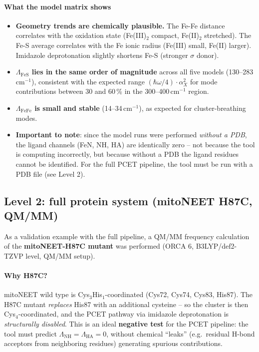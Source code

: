 \documentclass[11pt,a4paper,twoside]{article}
\theoremstyle{remark}
\begin{document}
\paragraph{What the model matrix shows}
\begin{itemize}\setlength{\itemsep}{0pt}
  \item \textbf{Geometry trends are chemically plausible.}
        The Fe-Fe distance correlates with the oxidation state
        (Fe(III)$_2$ compact, Fe(II)$_2$ stretched). The Fe-S
        average correlates with the Fe ionic radius (Fe(III)
        small, Fe(II) larger). Imidazole deprotonation slightly
        shortens Fe-S (stronger $\sigma$ donor).
  \item \textbf{$\Lambda_\text{FeS}$ lies in the same order of
        magnitude} across all five models (130--283\,cm$^{-1}$),
        consistent with the expected range
        $(\hbar\omega/4)\cdot\alpha_X^2$ for mode contributions
        between 30 and 60\,\% in the 300--400\,cm$^{-1}$ region.
  \item \textbf{$\Lambda_\text{FeFe}$ is small and stable}
        (14--34\,cm$^{-1}$), as expected for cluster-breathing
        modes.
  \item \textbf{Important to note}: since the model runs were
        performed \emph{without a PDB}, the ligand channels (FeN,
        NH, HA) are identically zero -- not because the tool is
        computing incorrectly, but because without a PDB the
        ligand residues cannot be identified. For the full PCET
        pipeline, the tool must be run with a PDB file (see
        Level 2).
\end{itemize}

\subsection{Level 2: full protein system (mitoNEET H87C, QM/MM)}
\label{sec:val-mitoneet-h87c}

As a validation example with the full pipeline, a QM/MM frequency
calculation of the \textbf{mitoNEET-H87C mutant} was performed
(ORCA 6, B3LYP/def2-TZVP level, QM/MM setup).

\paragraph{Why H87C?}
mitoNEET wild type is Cys$_3$His$_1$-coordinated (Cys72, Cys74,
Cys83, His87). The H87C mutant \emph{replaces} His87 with an
additional cysteine -- so the cluster is then Cys$_4$-coordinated,
and the PCET pathway via imidazole deprotonation is
\emph{structurally disabled}. This is an ideal \textbf{negative
test} for the PCET pipeline: the tool must predict
$\Lambda_\text{NH} = \Lambda_\text{HA} = 0$, without chemical
``leaks'' (e.g.\ residual H-bond acceptors from neighboring
residues) generating spurious contributions.
\end{document}
